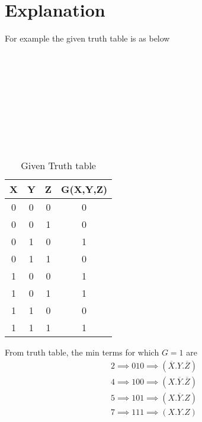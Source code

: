 \documentclass{article}
\begin{document}
\section{Explanation}
For example the given truth table is as below\\\\\\\\\\\\\\\\\\\\
\begin{table} [h!]
    \centering
    \begin{tabular}{ | c | c | c | c | }
    \hline
    X & Y & Z & G(X,Y,Z) \\
    \hline
    0 & 0 & 0 & 0 \\
    0 & 0 & 1 & 0 \\
    0 & 1 & 0 & 1 \\
    0 & 1 & 1 & 0 \\
    1 & 0 & 0 & 1 \\
    1 & 0 & 1 & 1 \\
    1 & 1 & 0 & 0 \\
    1 & 1 & 1 & 1 \\
     \hline
\end{tabular}
\caption{Given Truth table}
\label{Table1}
\end{table}
\newline
From truth table, the min terms for which $G=1$ are
\begin{equation}
\begin{split}
    2\implies010\implies\left(\overline{X}.Y.\overline{Z}\right)\\ 4\implies100\implies\left(X.\overline{Y}.\overline{Z}\right)\\ 5\implies101\implies\left(X.\overline{Y}.Z\right)\\ 7\implies111\implies\left(X.Y.Z\right)\\
\end{split}
\end{equation}\\
\end{document}
